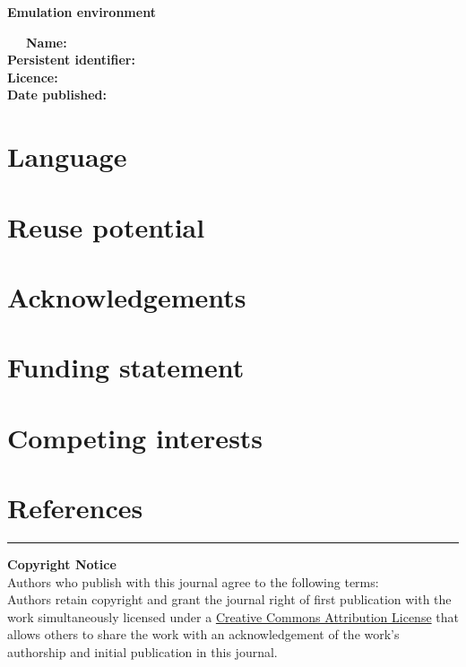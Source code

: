 \documentclass{jors}
\begin{document}
\textbf{Emulation environment}

~~~\textbf{Name:} \\
\hspace*{0.333em}\hspace*{0.333em}\hspace*{0.333em}\textbf{Persistent
identifier:} \\
\hspace*{0.333em}\hspace*{0.333em}\hspace*{0.333em}\textbf{Licence:} \\
\hspace*{0.333em}\hspace*{0.333em}\hspace*{0.333em}\textbf{Date
published:}

\section*{Language}

\section{Reuse potential}

\section*{Acknowledgements}

\section*{Funding statement}

\section*{Competing interests}

\section*{References}

\vspace{2cm}

\rule{\textwidth}{1pt}

{ \bf Copyright Notice} \\
Authors who publish with this journal agree to the following terms: \\

Authors retain copyright and grant the journal right of first publication with the work simultaneously licensed under a  \href{http://creativecommons.org/licenses/by/3.0/}{Creative Commons Attribution License} that allows others to share the work with an acknowledgement of the work's authorship and initial publication in this journal. \\
\end{document}
